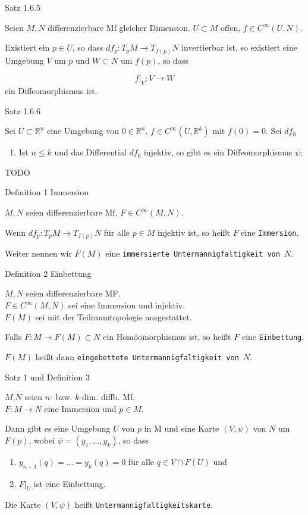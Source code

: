 \documentclass[a6paper,11pt,grid=front]{kartei}
\newcommand{\fl}[1]{\begin{flushleft}
 #1 \end{flushleft}}
\newcommand{\R}{\mathbb{R}}
\begin{document}
\nonameyet
{Satz 1.6.5} {}
{
Seien $M,N$ differenzierbare Mf gleicher Dimension. $U \subset M$ offen, 
$f\in C^\infty(U,N)$.
\fl{Existiert ein $p\in U$, so dass $df_p : T_pM \to T_{f(p)}N$ invertierbar
ist,
so existiert eine Umgebung $V$ um $p$ und $W\subset N$ um $f(p)$, so dass }
\[
f|_V : V \to W
\]
ein Diffeomorphismus ist.
}
{}


\nonameyet
{Satz 1.6.6} {}
{
Sei $U\subset \R^n$ eine Umgebung von $0\in \R^n$. $f\in C^\infty(U,\R^k)$ mit
$f(0) = 0 $. Sei $df_0$ 
\begin{enumerate}[1.]
\item Ist $n \leq k$ und das Differential $df_0$ injektiv, so gibt es ein
Diffeomorphismus $\psi : $
\end{enumerate}
TODO
}
{}


\nonameyet
{Definition 1} {Immersion}
{
$M,N$ seien differenzierbare Mf. $F \in C^\infty(M,N)$. 
\fl{Wenn $df_p: T_pM \to T_{f(p)}N$ für alle $p\in M$ injektiv ist, so 
heißt $F$ eine \texttt{Immersion}.}
\fl{Weiter nennen wir $F(M)$ eine \texttt{immersierte Untermannigfaltigkeit
von $N$}.}
}
{}
\newcommand{\point}{\mathbf{\cdot}}
\nonameyet
{Definition 2} {Einbettung}
{
 $M,N$ seien differenzierbare MF. 
\\
$F \in C^\infty(M,N)$ sei eine Immersion und 
injektiv. 
\\
$F(M)$ sei mit der Teilraumtopologie ausgestattet. 

\fl{Falls $F : M \to F(M) \subset N$ ein Homöomorphismus ist, so heißt 
$F$ eine \texttt{Einbettung}.

\fl{$F(M)$ heißt dann \texttt{eingebettete Untermannigfaltigkeit von $N$}.}
} 
}
{}

\nonameyet
{Satz 1 und Definition 3} {}
{
$M$,$N$ seien $n$- bzw. $k$-dim. diffb. Mf,
\\
$F : M \to N$ eine Immersion und $p \in M$.
\\

\fl{Dann gibt es eine Umgebung $U$ von $p$ in M und eine Karte $(V,\psi)$
von $N$ um $F(p)$, wobei $\psi = (y_1,\dots,y_k)$, so dass

\begin{enumerate}[1.]
\item $y_{n+1}(q) = \dots = y_{k}(q) = 0$ für alle $q \in V \cap F(U)$ und 
\item $F|_U$ ist eine Einbettung.
\end{enumerate}

\fl{Die Karte $(V,\psi)$ heißt \texttt{Untermannigfaltigkeitskarte}.}
}
}
{}
\end{document}
